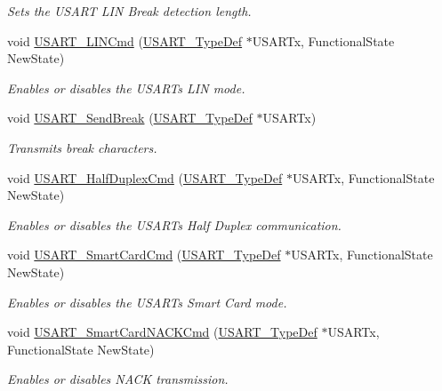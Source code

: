 \begin{DoxyCompactItemize}
\begin{DoxyCompactList}\small\item\em Sets the U\+S\+A\+RT L\+IN Break detection length. \end{DoxyCompactList}\item 
void \hyperlink{group___u_s_a_r_t_ga9fdd6296f4ca4acdfcbd58bf56bd4185}{U\+S\+A\+R\+T\+\_\+\+L\+I\+N\+Cmd} (\hyperlink{struct_u_s_a_r_t___type_def}{U\+S\+A\+R\+T\+\_\+\+Type\+Def} $\ast$U\+S\+A\+R\+Tx, Functional\+State New\+State)
\begin{DoxyCompactList}\small\item\em Enables or disables the U\+S\+A\+RT\textquotesingle{}s L\+IN mode. \end{DoxyCompactList}\item 
void \hyperlink{group___u_s_a_r_t_ga39a3d33e23ee28529fa8f7259ce6811e}{U\+S\+A\+R\+T\+\_\+\+Send\+Break} (\hyperlink{struct_u_s_a_r_t___type_def}{U\+S\+A\+R\+T\+\_\+\+Type\+Def} $\ast$U\+S\+A\+R\+Tx)
\begin{DoxyCompactList}\small\item\em Transmits break characters. \end{DoxyCompactList}\item 
void \hyperlink{group___u_s_a_r_t_gaaa23b05fe0e1896bad90da7f82750831}{U\+S\+A\+R\+T\+\_\+\+Half\+Duplex\+Cmd} (\hyperlink{struct_u_s_a_r_t___type_def}{U\+S\+A\+R\+T\+\_\+\+Type\+Def} $\ast$U\+S\+A\+R\+Tx, Functional\+State New\+State)
\begin{DoxyCompactList}\small\item\em Enables or disables the U\+S\+A\+RT\textquotesingle{}s Half Duplex communication. \end{DoxyCompactList}\item 
void \hyperlink{group___u_s_a_r_t_gabd1347e244c623447151ba3a5e986c5f}{U\+S\+A\+R\+T\+\_\+\+Smart\+Card\+Cmd} (\hyperlink{struct_u_s_a_r_t___type_def}{U\+S\+A\+R\+T\+\_\+\+Type\+Def} $\ast$U\+S\+A\+R\+Tx, Functional\+State New\+State)
\begin{DoxyCompactList}\small\item\em Enables or disables the U\+S\+A\+RT\textquotesingle{}s Smart Card mode. \end{DoxyCompactList}\item 
void \hyperlink{group___u_s_a_r_t_ga62e22f47e38aa53f2edce8771f7a5dfa}{U\+S\+A\+R\+T\+\_\+\+Smart\+Card\+N\+A\+C\+K\+Cmd} (\hyperlink{struct_u_s_a_r_t___type_def}{U\+S\+A\+R\+T\+\_\+\+Type\+Def} $\ast$U\+S\+A\+R\+Tx, Functional\+State New\+State)
\begin{DoxyCompactList}\small\item\em Enables or disables N\+A\+CK transmission. \end{DoxyCompactList}\item 

\end{DoxyCompactItemize}
